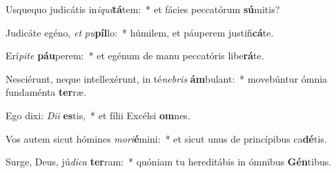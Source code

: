 \item Usquequo judicátis in\textit{i}\textit{qui}\textbf{tá}tem:~* et fácies peccatórum \textbf{sú}mitis?
\item Judicáte egéno, \textit{et} \textit{pu}\textbf{píl}lo:~* húmilem, et páuperem justifi\textbf{cá}te.
\item Erí\textit{pi}\textit{te} \textbf{páu}perem:~* et egénum de manu peccatóris libe\textbf{rá}te.
\item Nesciérunt, neque intellexérunt, in té\textit{ne}\textit{bris} \textbf{ám}bulant:~* movebúntur ómnia fundaménta \textbf{ter}ræ.
\item Ego dixi: \textit{Di}\textit{i} \textbf{es}tis,~* et fílii Excélsi \textbf{om}nes.
\item Vos autem sicut hómines \textit{mo}\textit{ri}\textbf{é}mini:~* et sicut unus de princípibus ca\textbf{dé}tis.
\item Surge, Deus, jú\textit{di}\textit{ca} \textbf{ter}ram:~* quóniam tu hereditábis in ómnibus \textbf{Gén}tibus.
